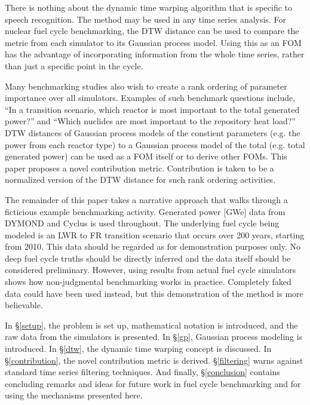 There is nothing about the dynamic time warping algorithm that is specific 
to speech recognition. The method
may be used in any time series analysis. For nuclear fuel cycle benchmarking,
the DTW distance can be used to compare the metric from each simulator to its
Gaussian process model. Using this as an FOM has the advantage of 
incorporating information from the whole time series, rather than just a 
specific point in the cycle.

Many benchmarking studies also wish to create a rank ordering of parameter
importance over all simulators. Examples of such benchmark questions include, 
``In a transition scenario,
which reactor is most important to the total generated power?'' and ``Which
nuclides are most important to the repository heat load?'' DTW distances 
of Gaussian process models of the constient parameters (e.g. the power from
each reactor type) to a Gaussian process model of the total (e.g. total 
generated power) can be used as a FOM itself or to derive other FOMs. 
This paper proposes a novel contribution metric. 
Contribution is taken to be a normalized version of the DTW 
distance for such rank ordering activities.

The remainder of this paper takes a narrative approach that walks through 
a ficticious example benchmarking activity. Generated power [GWe] data 
from DYMOND \cite{yacout2005modeling,feng2015dymond} and Cyclus 
\cite{DBLP:journals/corr/HuffGCFMOSSW15,cyclus_v1_0} is used throughout. 
The underlying fuel cycle being modeled is an
LWR to FR transition scenario that occurs over 200 years, starting from 2010.  
This data should be regarded as for demonstration purposes only. No deep
fuel cycle truths should be directly inferred and the data itself should be 
considered preliminary. However, 
using results from actual fuel cycle simulators shows how
non-judgmental benchmarking works in practice. Completely faked data could 
have been used instead, but this demonstration of the method is more 
believable.

In \S \ref{setup}, the problem is set up, mathematical notation is introduced,
and the raw data from the simulators is presented. In \S \ref{gp}, Gaussian 
process 
modeling is introduced. In \S \ref{dtw}, the dynamic time warping concept is
discussed. In \S \ref{contribution}, the novel contribution metric is 
derived.
\S \ref{filtering} warns against standard time series filtering
techniques. And finally, \S \ref{conclusion} contains concluding remarks
and ideas for future work in fuel cycle benchmarking and for 
using the mechanisms presented here.

